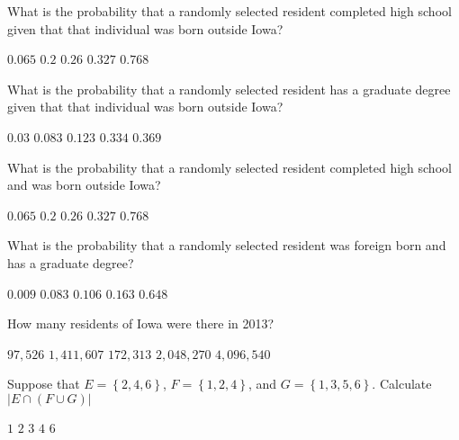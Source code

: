 \documentclass[answers,12pt]{exam}
\begin{document}
\begin{questions}
\question What is the probability that a randomly selected
resident completed high school given that
that individual was born outside Iowa?\\
\begin{oneparchoices}
\choice $0.065$ %
\choice $0.2$ %
\correctchoice $0.26$
\choice $0.327$ %
\choice $0.768$ %
\end{oneparchoices}

\question What is the probability that a randomly selected
resident has a graduate degree given that
that individual was born outside Iowa?\\
\begin{oneparchoices}
\choice $0.03$ %
\choice $0.083$ %
\correctchoice $0.123$
\choice $0.334$ %
\choice $0.369$ %
\end{oneparchoices}

\question What is the probability that a randomly selected
resident completed high school and was born
outside Iowa?
\begin{oneparchoices}
\correctchoice $0.065$
\choice $0.2$ %
\choice $0.26$ %
\choice $0.327$ %
\choice $0.768$ %
\end{oneparchoices}

\question What is the probability that a randomly selected
resident was foreign born and has a graduate degree?\\
\begin{oneparchoices}
\correctchoice $0.009$
\choice $0.083$ %
\choice $0.106$ %
\choice $0.163$ %
\choice $0.648$ %
\end{oneparchoices}

\question\label{LastIowa} How many residents of Iowa were there in 2013?\\
\begin{oneparchoices}
\choice $97,526$
\choice $1,411,607$
\choice $172,313$
\correctchoice $2,048,270$
\choice $4,096,540$ %
\end{oneparchoices}

\question Suppose that $E=\left\{2,4,6\right\}$,
$F=\left\{1,2,4\right\}$, and $G=\left\{1,3,5,6\right\}$.
Calculate $\left|E\cap\left(F\cup G\right)\right|$
\begin{oneparchoices}
\choice $1$
\choice $2$
\correctchoice $3$
\choice $4$
\choice $6$
\end{oneparchoices}


\end{questions}
\end{document}
